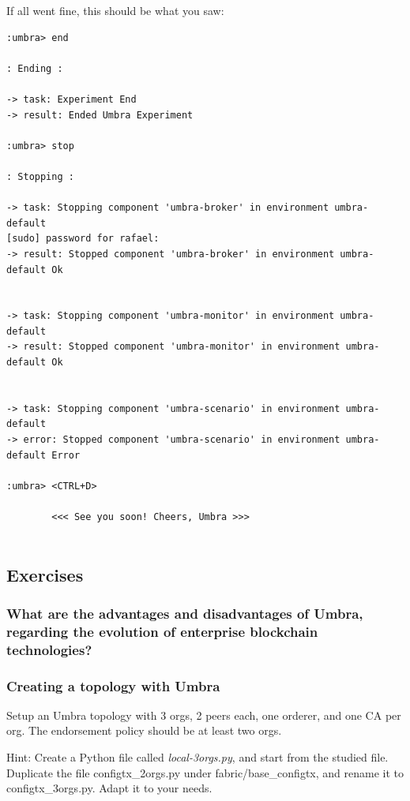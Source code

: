 \documentclass[12pt,a4paper]{article}
\theoremstyle{definition}
\begin{document}
If all went fine, this should be what you saw:
\begin{verbatim}
:umbra> end

: Ending :

-> task: Experiment End
-> result: Ended Umbra Experiment

:umbra> stop

: Stopping :

-> task: Stopping component 'umbra-broker' in environment umbra-default
[sudo] password for rafael: 
-> result: Stopped component 'umbra-broker' in environment umbra-default Ok


-> task: Stopping component 'umbra-monitor' in environment umbra-default
-> result: Stopped component 'umbra-monitor' in environment umbra-default Ok


-> task: Stopping component 'umbra-scenario' in environment umbra-default
-> error: Stopped component 'umbra-scenario' in environment umbra-default Error

:umbra> <CTRL+D>

        <<< See you soon! Cheers, Umbra >>>             


\end{verbatim}


\subsection{Exercises} 


\subsubsection*{What are the advantages and disadvantages of Umbra, regarding the evolution of enterprise blockchain technologies?}



\subsubsection*{Creating a topology with Umbra}
Setup an Umbra topology with 3 orgs, 2 peers each, one orderer, and one CA per org. The endorsement policy should be at least two orgs.

Hint:
Create a Python file called \emph{local-3orgs.py}, and start from the studied file.
Duplicate the file configtx\_2orgs.py under fabric/base\_configtx, and rename it to configtx\_3orgs.py.
Adapt it to your needs. 


%
%
\end{document}
